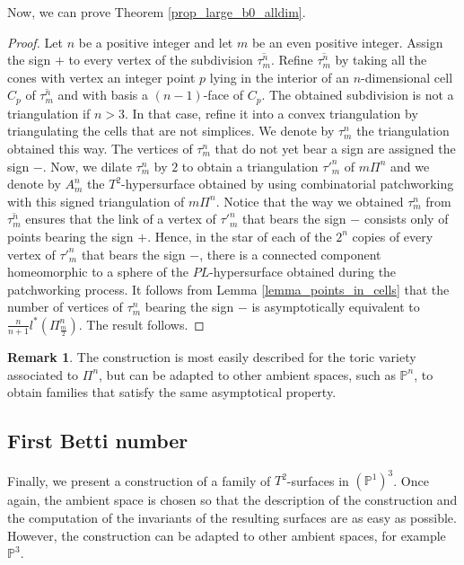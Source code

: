 \documentclass[12pt]{article}
\renewcommand{\P}{\mathbb{P}}
\theoremstyle{definition}
\newtheorem{rmk}{Remark}[section]
\begin{document}
    Now, we can prove Theorem \ref{prop_large_b0_alldim}.

\begin{proof}
    Let $n$ be a positive integer and let $m$ be an even positive integer. Assign the sign $+$ to every vertex of the subdivision $\overline{\tau_m^n}$. Refine $\overline{\tau_m^n}$ by taking all the cones with vertex an integer point $p$ lying in the interior of an $n$-dimensional cell $C_p$ of $\overline{\tau_m^n}$ and with basis a $(n-1)$-face of $C_p$. The obtained subdivision is not a triangulation if $n>3$. In that case, refine it into a convex triangulation by triangulating the cells that are not simplices. %
    We denote by $\tau_m^n$ the triangulation obtained this way. The vertices of $\tau_m^n$ that do not yet bear a sign are assigned the sign $-$. Now, we dilate $\tau_m^n$ by $2$ to obtain a triangulation ${\tau'}_m^{n}$ of $m\Pi^n$ and we denote by $A_m^n$ the $T^2$-hypersurface obtained by using combinatorial patchworking with this signed triangulation of $m\Pi^n$. Notice that the way we obtained $\tau_m^n$ from $\overline{\tau_m^n}$ ensures that the link of a vertex of ${\tau'}_m^{n}$ that bears the sign $-$ consists only of points bearing the sign $+$. Hence, in the star of each of the $2^n$ copies of every vertex of ${\tau'}_m^{n}$ that bears the sign $-$, there is a connected component homeomorphic to a sphere of the $PL$-hypersurface obtained during the patchworking process. It follows from Lemma \ref{lemma_points_in_cells} that the number of vertices of $\tau_m^n$ bearing the sign $-$ is asymptotically equivalent to $\frac{n}{n+1}l^*(\Pi_{\frac{m}{2}}^n)$. The result follows.
\end{proof}

\begin{rmk}
    The construction is most easily described for the toric variety associated to $\Pi^n$, but can be adapted to other ambient spaces, such as $\P^n$, to obtain families that satisfy the same asymptotical property.
\end{rmk}

\subsection{First Betti number}

Finally, we present a construction of a family of $T^2$-surfaces in $(\P^1)^3$. Once again, the ambient space is chosen so that the description of the construction and the computation of the invariants of the resulting surfaces are as easy as possible. However, the construction can be adapted to other ambient spaces, for example $\P^3$.
\end{document}
